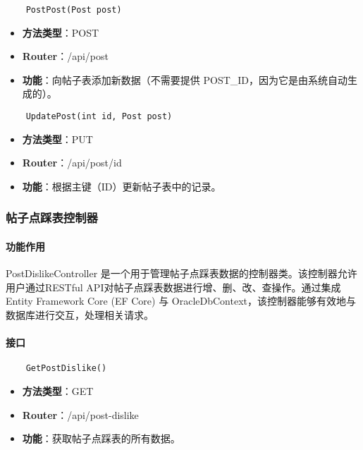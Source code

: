 \begin{verbatim}
	PostPost(Post post)
\end{verbatim}

\begin{itemize}
	\item \textbf{方法类型}：POST
	\item \textbf{Router}：/api/post
	\item \textbf{功能}：向帖子表添加新数据（不需要提供 POST\_ID，因为它是由系统自动生成的）。
\end{itemize}

\begin{verbatim}
	UpdatePost(int id, Post post)
\end{verbatim}

\begin{itemize}
	\item \textbf{方法类型}：PUT
	\item \textbf{Router}：/api/post/{id}
	\item \textbf{功能}：根据主键（ID）更新帖子表中的记录。
\end{itemize}

\subsubsection{帖子点踩表控制器}

\paragraph{功能作用}

PostDislikeController 是一个用于管理帖子点踩表数据的控制器类。该控制器允许用户通过RESTful API对帖子点踩表数据进行增、删、改、查操作。通过集成 Entity Framework Core (EF Core) 与 OracleDbContext，该控制器能够有效地与数据库进行交互，处理相关请求。

\paragraph{接口}

\begin{verbatim}
	GetPostDislike()
\end{verbatim}

\begin{itemize}
	\item \textbf{方法类型}：GET
	\item \textbf{Router}：/api/post-dislike
	\item \textbf{功能}：获取帖子点踩表的所有数据。
\end{itemize}

